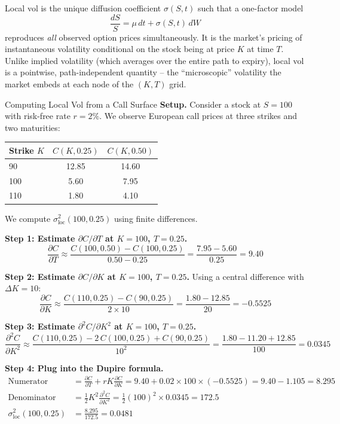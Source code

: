 \begin{intuition}
Local vol is the unique diffusion coefficient $\sigma(S,t)$ such that a one-factor model
\[
  \frac{dS}{S} = \mu\,dt + \sigma(S,t)\,dW
\]
reproduces \emph{all} observed option prices simultaneously.
It is the market's pricing of instantaneous volatility conditional on the stock being at price $K$ at time $T$.
Unlike implied volatility (which averages over the entire path to expiry), local vol is a pointwise, path-independent quantity -- the ``microscopic'' volatility the market embeds at each node of the $(K,T)$ grid.
\end{intuition}

\begin{workedexample}{Computing Local Vol from a Call Surface}
\label{ex:dupire-local-vol}
\textbf{Setup.} Consider a stock at $S = 100$ with risk-free rate $r = 2\%$.
We observe European call prices at three strikes and two maturities:

\begin{center}
\begin{tabular}{@{}lcc@{}}
\toprule
Strike $K$ & $C(K, 0.25)$ & $C(K, 0.50)$ \\
\midrule
90  & 12.85 & 14.60 \\
100 & 5.60  & 7.95  \\
110 & 1.80  & 4.10  \\
\bottomrule
\end{tabular}
\end{center}

We compute $\sigma_{\text{loc}}^2(100, 0.25)$ using finite differences.

\textbf{Step 1: Estimate $\partial C / \partial T$ at $K=100$, $T=0.25$.}
\[
  \frac{\partial C}{\partial T} \approx \frac{C(100, 0.50) - C(100, 0.25)}{0.50 - 0.25}
  = \frac{7.95 - 5.60}{0.25} = 9.40
\]

\textbf{Step 2: Estimate $\partial C / \partial K$ at $K=100$, $T=0.25$.}
Using a central difference with $\Delta K = 10$:
\[
  \frac{\partial C}{\partial K} \approx \frac{C(110, 0.25) - C(90, 0.25)}{2 \times 10}
  = \frac{1.80 - 12.85}{20} = -0.5525
\]

\textbf{Step 3: Estimate $\partial^2 C / \partial K^2$ at $K=100$, $T=0.25$.}
\[
  \frac{\partial^2 C}{\partial K^2} \approx \frac{C(110, 0.25) - 2\,C(100, 0.25) + C(90, 0.25)}{10^2}
  = \frac{1.80 - 11.20 + 12.85}{100} = 0.0345
\]

\textbf{Step 4: Plug into the Dupire formula.}
\begin{align*}
  \text{Numerator} &= \frac{\partial C}{\partial T} + rK\frac{\partial C}{\partial K}
    = 9.40 + 0.02 \times 100 \times (-0.5525)
    = 9.40 - 1.105 = 8.295 \\[6pt]
  \text{Denominator} &= \tfrac{1}{2}K^2 \frac{\partial^2 C}{\partial K^2}
    = \tfrac{1}{2}(100)^2 \times 0.0345
    = 172.5 \\[6pt]
  \sigma_{\text{loc}}^2(100, 0.25) &= \frac{8.295}{172.5} = 0.0481
\end{align*}


\end{workedexample}
